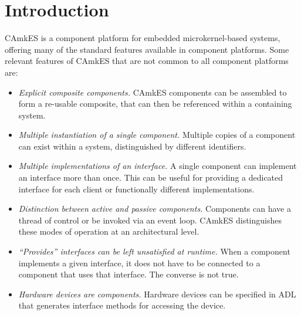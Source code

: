 %
%
%

\chapter{Introduction}
CAmkES is a component platform for embedded microkernel-based systems, offering
many of the standard features available in component platforms.
Some relevant features of CAmkES that are not common to all component platforms
are:
\begin{itemize}
  \item \emph{Explicit composite components.} CAmkES components can be
    assembled to form a re-usable composite, that can then be referenced within
    a containing system.
  \item \emph{Multiple instantiation of a single component.} Multiple copies of
    a component can exist within a system, distinguished by different
    identifiers.
  \item \emph{Multiple implementations of an interface.} A single component can
    implement an interface more than once. This can be useful for providing a
    dedicated interface for each client or functionally different
    implementations.
  \item \emph{Distinction between active and passive components.} Components
    can have a thread of control or be invoked via an event loop. CAmkES
    distinguishes these modes of operation at an architectural level.
  \item \emph{``Provides'' interfaces can be left unsatisfied at runtime.} When
    a component implements a given interface, it does not have to be connected
    to a component that uses that interface. The converse is not true.
  \item \emph{Hardware devices are components.} Hardware devices can be
    specified in ADL that generates interface methods for accessing the device.
\end{itemize}
